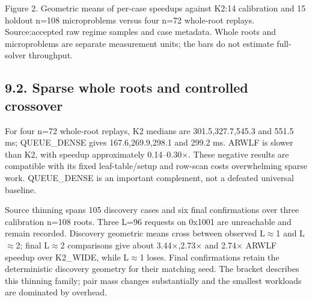 \documentclass[10pt,letterpaper]{article}
\begin{document}
\begin{center}
\end{center}


{\small\color{teal}Figure 2. Geometric means of per-case speedups against K2:14 calibration and 15 holdout n=108 microproblems versus four n=72 whole-root replays. Source:accepted raw regime samples and case metadata. Whole roots and microproblems are separate measurement units; the bars do not estimate full-solver throughput.\par}

\subsection*{9.2. Sparse whole roots and controlled crossover}

For four n=72 whole-root replays, K2 medians are 301.5,327.7,545.3 and 551.5 ms; QUEUE\_DENSE gives 167.6,269.9,298.1 and 299.2 ms. ARWLF is slower than K2, with speedup approximately 0.14--0.30\ensuremath{\times}. These negative results are compatible with its fixed leaf-table/setup and row-scan costs overwhelming sparse work. QUEUE\_DENSE is an important complement, not a defeated universal baseline.


Source thinning spans 105 discovery cases and six final confirmations over three calibration n=108 roots. Three L=96 requests on 0x1001 are unreachable and remain recorded. Discovery geometric means cross between observed L\ensuremath{\approx}1 and L\ensuremath{\approx}2; final L\ensuremath{\approx}2 comparisons give about 3.44\ensuremath{\times},2.73\ensuremath{\times} and 2.74\ensuremath{\times} ARWLF speedup over K2\_WIDE, while L\ensuremath{\approx}1 loses. Final confirmations retain the deterministic discovery geometry for their matching seed. The bracket describes this thinning family; pair mass changes substantially and the smallest workloads are dominated by overhead.
\end{document}
